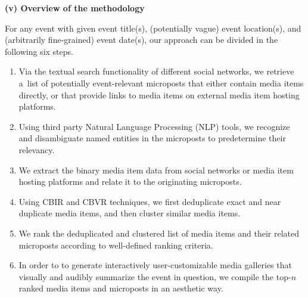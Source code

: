 \begin{abstracts}
\textbf{(v) Overview of the methodology}

For any event with given event title(s),
(potentially vague) event location(s), and
(arbitrarily fine-grained) event date(s), 
our approach can be divided in the following six steps.

\begin{enumerate}
  \item Via the textual search functionality of
        different social networks,
        we retrieve a~list of potentially event-relevant
        microposts that either contain media items directly,
        or that provide links to media items
        on external media item hosting platforms.
  \item Using third party
        Natural Language Processing (NLP) tools,
        we recognize and disambiguate named entities
        in the microposts to predetermine their relevancy.
  \item We extract the binary media item data
        from social networks or media item hosting platforms
        and relate it to the originating microposts.
  \item Using CBIR and CBVR techniques, we first deduplicate
        exact and near duplicate media items,
        and then cluster similar media items.
  \item We rank the deduplicated and clustered list
        of media items and their related microposts
        according to well-defined ranking criteria.
  \item In order to to generate interactively user-customizable
        media galleries that visually and audibly summarize the
        event in question, we compile the top-$n$ ranked
        media items and microposts in an aesthetic way.
\end{enumerate}
\end{abstracts}
